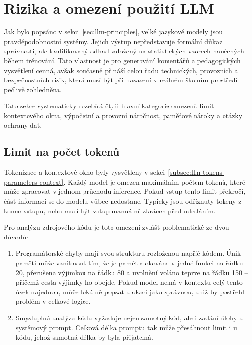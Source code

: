\section{Rizika a omezení použití LLM}
\label{sec:llm-limitations}


Jak bylo popsáno v sekci~\ref{sec:llm-principles}, velké jazykové modely jsou pravděpodobnostní systémy.
Jejich výstup nepředstavuje formální důkaz správnosti, ale kvalifikovaný odhad založený na statistických vzorech naučených během trénování.
Tato vlastnost je pro generování komentářů a pedagogických vysvětlení cenná, avšak současně přináší celou řadu technických, provozních a bezpečnostních rizik, která musí být při nasazení v reálném školním prostředí pečlivě zohledněna.

Tato sekce systematicky rozebírá čtyři hlavní kategorie omezení: limit kontextového okna, výpočetní a provozní náročnost, paměťové nároky a otázky ochrany dat.

\subsection{Limit na počet tokenů}
\label{subsec:llm-token-limit}

Tokenizace a kontextové okno byly vysvětleny v sekci~\ref{subsec:llm-tokens-parameters-context}.
Každý model je omezen maximálním počtem tokenů, které může zpracovat v jednom průchodu inference.
Pokud vstup tento limit překročí, část informací se do modelu vůbec nedostane.
Typicky jsou odříznuty tokeny z konce vstupu, nebo musí být vstup manuálně zkrácen před odesláním.

Pro analýzu zdrojového kódu je toto omezení zvlášť problematické ze dvou důvodů:
\begin{enumerate}
    \item Programátorské chyby mají svou strukturu rozloženou napříč kódem.
    Únik paměti může vzniknout tím, že je paměť alokována v jedné funkci na řádku 20, přerušena výjimkou na řádku 80 a uvolnění voláno teprve na řádku 150 -- přičemž cesta výjimky ho obejde.
    Pokud model nemá v kontextu celý tento úsek najednou, může lokálně popsat alokaci jako správnou, aniž by postřehl problém v celkové logice.

    \item Smysluplná analýza kódu vyžaduje nejen samotný kód, ale i zadání úlohy a systémový prompt.
    Celková délka promptu tak může přesáhnout limit i u kódu, jehož samotná délka by byla přijatelná.
\end{enumerate}

